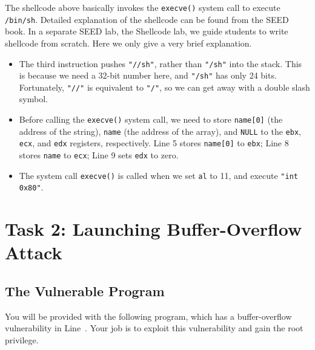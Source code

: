The shellcode above basically invokes the \texttt{execve()} system call 
to execute \texttt{/bin/sh}.
Detailed explanation of the shellcode can be found from the SEED book. 
In a separate SEED lab, the Shellcode lab, we guide students to write 
shellcode from scratch. Here we only give a very brief explanation. 
\begin{itemize}
\item The third instruction pushes \texttt{"//sh"}, rather than \texttt{"/sh"} into the 
stack. This is because we need a 32-bit number here, and \texttt{"/sh"} 
has only 24 bits. Fortunately, \texttt{"//"} is equivalent to \texttt{"/"}, so we can get 
away with a double slash symbol. 

\item Before calling the {\tt execve()}
system call, we need to store {\tt name[0]} (the address of the string), 
{\tt name} (the address of the array), and {\tt NULL} to
the {\tt ebx}, {\tt ecx}, and {\tt edx} registers, respectively. 
Line 5 stores {\tt name[0]} to {\tt ebx}; 
Line 8 stores {\tt name} to    {\tt ecx}; 
Line 9 sets {\tt edx} to zero. 

\item The system call {\tt execve()} is called when we set {\tt al} to
11, and execute {\tt "int 0x80"}.
\end{itemize}


\section{Task 2: Launching Buffer-Overflow Attack}


\subsection{The Vulnerable Program}

You will be provided with the following program, which has 
a buffer-overflow vulnerability in Line~. Your job
is to exploit this vulnerability and gain the root privilege. 

